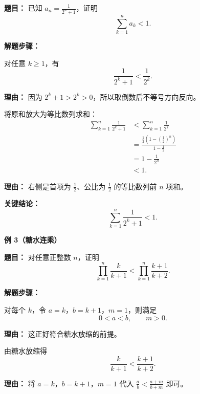 \begin{examplebox}
	\textbf{\textcolor{CExample}{题目：}}
	已知 $a_n=\frac1{2^n+1}$，证明
	\[
		\sum_{k=1}^n a_k<1.
	\]

	\textbf{\textcolor{CExample}{解题步骤：}}
	\begin{description}[style=nextline, leftmargin=2.8em, labelsep=0.5em, itemsep=0.45em]
		\item[\textbf{第一步（等比放缩）：}]
		      对任意 $k\ge1$，有
		      \[
			      \frac1{2^k+1}<\frac1{2^k}.
		      \]
		      \par\textbf{理由：} 因为 $2^k+1>2^k>0$，所以取倒数后不等号方向反向。

		\item[\textbf{第二步（等比求和）：}]
		      将原和放大为等比数列求和：
		      \[
			      \begin{aligned}
				      \sum_{k=1}^n\frac1{2^k+1}
				       & <\sum_{k=1}^n\frac1{2^k}                                        \\[2pt]
				       & =\frac{\frac12\left(1-\left(\frac12\right)^n\right)}{1-\frac12} \\[2pt]
				       & =1-\frac1{2^n}                                                  \\[2pt]
				       & <1.
			      \end{aligned}
		      \]
		      \par\textbf{理由：} 右侧是首项为 $\frac12$、公比为 $\frac12$ 的等比数列前 $n$ 项和。
	\end{description}

	\textbf{\textcolor{CExample}{关键结论：}}
	\[
		\boxed{\displaystyle\sum_{k=1}^n\frac1{2^k+1}<1}.
	\]

	\medskip
	\textbf{\textcolor{CExample}{例 3（糖水连乘）}}

	\textbf{\textcolor{CExample}{题目：}}
	对任意正整数 $n$，证明
	\[
		\prod_{k=1}^n\frac{k}{k+1}<\prod_{k=1}^n\frac{k+1}{k+2}.
	\]

	\textbf{\textcolor{CExample}{解题步骤：}}
	\begin{description}[style=nextline, leftmargin=2.8em, labelsep=0.5em, itemsep=0.45em]
		\item[\textbf{第一步（条件识别）：}]
		      对每个 $k$，令 $a=k$，$b=k+1$，$m=1$，则满足
		      \[
			      0<a<b,\qquad m>0.
		      \]
		      \par\textbf{理由：} 这正好符合糖水放缩的前提。

		\item[\textbf{第二步（糖水放缩）：}]
		      由糖水放缩得
		      \[
			      \frac{k}{k+1}<\frac{k+1}{k+2}.
		      \]
		      \par\textbf{理由：} 将 $a=k$，$b=k+1$，$m=1$ 代入 $\frac ab<\frac{a+m}{b+m}$ 即可。


\end{description}
\end{examplebox}
